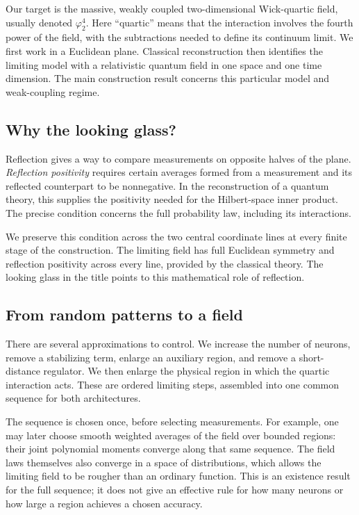 \documentclass[11pt]{article}
\theoremstyle{plain}
\theoremstyle{definition}
\theoremstyle{remark}
\begin{document}
Our target is the massive, weakly coupled two-dimensional Wick-quartic field,
usually denoted $\varphi^4_2$. Here ``quartic'' means that the interaction
involves the fourth power of the field, with the subtractions needed to define
its continuum limit. We first work in a Euclidean plane. Classical
reconstruction then identifies the limiting model with a relativistic quantum
field in one space and one time dimension. The main construction result concerns this particular model and weak-coupling regime.

\subsection{Why the looking glass?}\label{sec:intro-looking-glass}

Reflection gives a way to compare measurements on opposite halves of the
plane. \emph{Reflection positivity} requires certain averages formed from a
measurement and its reflected counterpart to be nonnegative. In the
reconstruction of a quantum theory, this supplies the positivity needed for
the Hilbert-space inner product. The precise condition concerns the full
probability law, including its interactions.

We preserve this condition across the two central coordinate lines at every
finite stage of the construction. The limiting field has full
Euclidean symmetry and reflection positivity across every line, provided by
the classical theory. The looking glass in the title points to this
mathematical role of reflection.

\subsection{From random patterns to a field}\label{sec:intro-route}

There are several approximations to control. We increase the number of
neurons, remove a stabilizing term, enlarge an auxiliary region, and remove a
short-distance regulator. We then enlarge the physical region in which the
quartic interaction acts. These are ordered limiting steps, assembled into
one common sequence for both architectures.

The sequence is chosen once, before selecting measurements. For example,
one may later choose smooth weighted averages of the field over bounded
regions: their joint polynomial moments converge along that same sequence.
The field laws themselves also converge in a space of distributions, which
allows the limiting field to be rougher than an ordinary function. This is
an existence result for the full sequence; it does not give an effective
rule for how many neurons or how large a region achieves a chosen accuracy.
\end{document}
